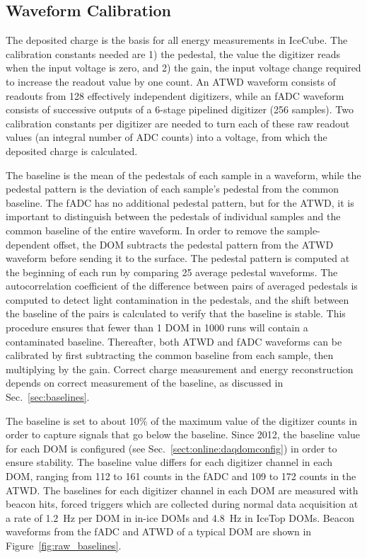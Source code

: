 \subsection{\label{sec:waveformcal}Waveform Calibration}

The deposited charge is the basis for all energy measurements in IceCube. The
calibration constants needed are 1) the pedestal, the value the digitizer
reads when the input voltage is zero, and 2) the gain, the input voltage change
required to increase the readout value by one count.  An ATWD waveform
consists of readouts from 128 effectively independent 
digitizers, while an fADC waveform consists of successive outputs of a 6-stage
pipelined digitizer (256 samples). Two calibration constants per digitizer are needed to turn each of these
raw readout values (an integral number of ADC counts) into a
voltage, from which the deposited charge is calculated.

The baseline is the mean of the pedestals of each sample in a waveform, while the pedestal pattern is
the deviation of each sample's pedestal from the common baseline.  The fADC
has no additional pedestal pattern, but for the ATWD, it is important to distinguish
between the pedestals of individual samples 
and the common baseline of the entire waveform.  In order to remove the
sample-dependent offset, the DOM subtracts the pedestal pattern from
the ATWD waveform before sending it to the surface. The pedestal pattern is
computed at the beginning of each 
run by comparing 25 average pedestal waveforms. The autocorrelation coefficient
of the difference between pairs of averaged pedestals is computed to detect light
contamination in the pedestals, and the shift between the baseline of
the pairs is calculated to verify that the baseline is stable. This
procedure ensures that fewer than 1 DOM in 1000 runs will contain a
contaminated baseline. Thereafter, both ATWD
and fADC waveforms can be calibrated by first subtracting the common
baseline from each sample, then multiplying by the gain. Correct charge
measurement and energy reconstruction depends on correct measurement
of the baseline, as discussed in Sec.~\ref{sec:baselines}.

The baseline is set to about 10\% of the maximum value of the
digitizer counts in
order to capture signals that go below the baseline. Since 2012, the
baseline value for each DOM is configured (see Sec.~\ref{sect:online:daqdomconfig}) in order to ensure 
stability. The baseline value differs for each digitizer channel in
each DOM, ranging from 112 to 161 counts in the fADC and 109 to 172
counts in the ATWD. The baselines for each digitizer channel in each DOM are measured with
beacon hits, forced triggers which are collected during normal data
acquisition at a rate of 1.2~Hz per DOM
in in-ice DOMs and 4.8~Hz in IceTop DOMs. Beacon waveforms
from the fADC and ATWD of a typical DOM are shown in Figure~\ref{fig:raw_baselines}.

